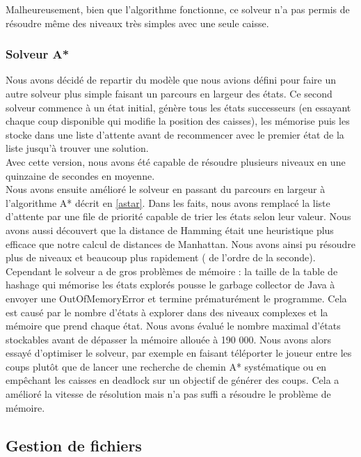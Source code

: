 \documentclass[a4paper,12pt]{article} %
\begin{document}
Malheureusement, bien que l'algorithme fonctionne, ce solveur n'a pas permis de résoudre même des niveaux très simples avec une seule caisse.

\subsubsection{Solveur A*}

Nous avons décidé de repartir du modèle que nous avions défini pour faire un autre solveur plus simple faisant un parcours en largeur des états.
Ce second solveur commence à un état initial, génère tous les états successeurs (en essayant chaque coup disponible qui modifie la position des caisses), les mémorise puis les stocke dans une liste d'attente avant de recommencer avec le premier état de la liste jusqu'à trouver une solution.\\
Avec cette version, nous avons été capable de résoudre plusieurs niveaux en une quinzaine de secondes en moyenne.\\

Nous avons ensuite amélioré le solveur en passant du parcours en largeur à l'algorithme A* décrit en \ref{astar}. Dans les faits, nous avons remplacé la liste d'attente par une file de priorité capable de trier les états selon leur valeur. Nous avons aussi découvert que la distance de Hamming était une heuristique plus efficace que notre calcul de distances de Manhattan. Nous avons ainsi pu résoudre plus de niveaux et beaucoup plus rapidement ( de l'ordre de la seconde).\\
Cependant le solveur a de gros problèmes de mémoire : la taille de la table de hashage qui mémorise les états explorés pousse le garbage collector de Java à envoyer une OutOfMemoryError et termine prématurément le programme. Cela est causé par le nombre d'états à explorer dans des niveaux complexes et la mémoire que prend chaque état. Nous avons évalué le nombre maximal d'états stockables avant de dépasser la mémoire allouée à 190 000.
Nous avons alors essayé d'optimiser le solveur, par exemple en faisant téléporter le joueur entre les coups plutôt que de lancer une recherche de chemin A* systématique ou en empêchant les caisses en deadlock sur un objectif de générer des coups. Cela a amélioré la vitesse de résolution mais n'a pas suffi a résoudre le problème de mémoire.

\subsection{Gestion de fichiers}
\end{document}
